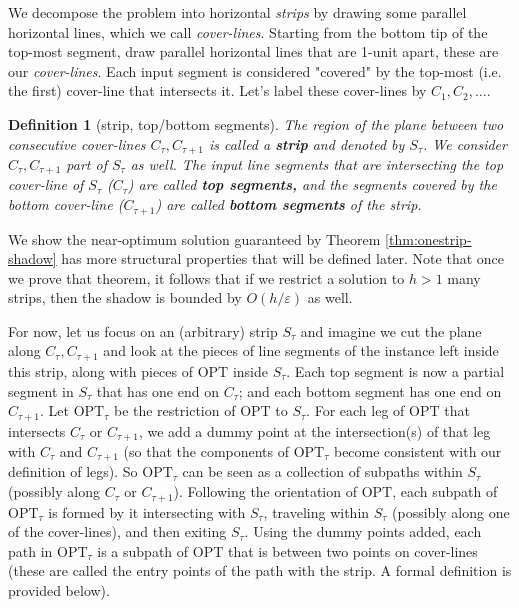 \documentclass[pdflatex,sn-mathphys-num]{sn-jnl}
\theoremstyle{thmstyleone}
\newtheorem{definition}{Definition} %
\newcommand{\eps}{\varepsilon}
\newcommand{\OPT}{{\text{OPT}}}
\begin{document}
\label{sec:bounded-shadow}
We decompose the problem into horizontal {\em strips} by drawing some parallel horizontal lines, which we call {\em cover-lines}.
Starting from the bottom tip of the top-most segment, draw parallel horizontal lines that are 1-unit apart, these are our {\em cover-lines}. Each input segment is considered "covered" by the top-most (i.e. the first) cover-line that intersects it. Let's label these cover-lines by $C_1,C_2,\ldots$.


\begin{definition}[strip, top/bottom segments]\label{def:strip/top-bottom}
	The region of the plane between two consecutive cover-lines $C_\tau,C_{\tau+1}$ is called a \textbf{strip} and denoted by $S_\tau$. 
	We consider $C_\tau,C_{\tau+1}$ part of $S_\tau$ as well.
	The input line segments that are intersecting the top cover-line of $S_\tau$ ($C_\tau$) are called \textbf{top segments,} and the segments covered by the bottom cover-line ($C_{\tau + 1}$) are called \textbf{bottom segments} of the strip.  
\end{definition}

We show the near-optimum solution guaranteed by Theorem \ref{thm:onestrip-shadow} has more structural properties that will be defined later. Note that once we prove that theorem, it follows that if we restrict a solution to $h>1$ many strips, then the shadow is bounded by $O(h/\eps)$ as well.

For now, let us focus on an (arbitrary) strip $S_\tau$ and imagine we cut the plane along $C_\tau,C_{\tau+1}$ and look at the pieces of line segments of the instance left inside this strip, along with pieces of $\OPT$ inside $S_\tau$. 
Each top segment is now a partial segment in $S_\tau$ that has one end on $C_\tau$; and each bottom segment has one end on $C_{\tau+1}$.
Let $\OPT_\tau$ be the restriction of $\OPT$ to $S_\tau$. 
For each leg of $\OPT$ that intersects $C_\tau$ or $C_{\tau+1}$, we add a dummy point at the intersection(s) of that leg with $C_\tau$ and $C_{\tau+1}$ (so that the components of $ \OPT_\tau $ become consistent with our definition of legs).
So $\OPT_\tau$ can be seen as a collection of subpaths within $S_\tau$ (possibly along $C_\tau$ or $C_{\tau+1}$). Following the orientation of $\OPT$, each subpath of $\OPT_\tau$ is formed by it intersecting with $S_\tau$, traveling within $S_\tau$ (possibly along one of the cover-lines), and then exiting $S_\tau$. Using the dummy points added, each path in $\OPT_\tau$ is a subpath of $\OPT$ that is between two points on cover-lines (these are called the entry points of the path with the strip. A formal definition is provided below).
\end{document}

